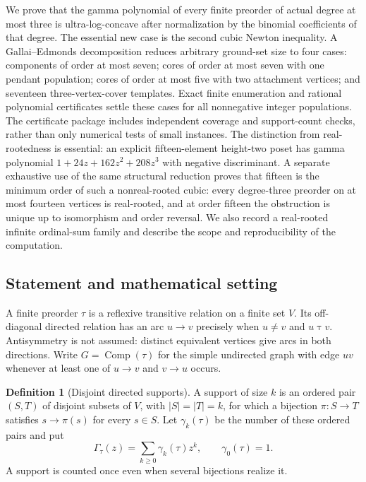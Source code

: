 \documentclass[11pt]{article}
\numberwithin{equation}{section}
\theoremstyle{definition}\newtheorem{definition}[theorem]{Definition}\newtheorem{remark}[theorem]{Remark}
\newcommand{\Ga}{\Gamma}                   %
\newcommand{\Comp}{\operatorname{Comp}}    %
\begin{document}
We prove that the gamma polynomial of every finite preorder of actual degree at most three is ultra-log-concave after normalization by the binomial coefficients of that degree. The essential new case is the second cubic Newton inequality. A Gallai--Edmonds decomposition reduces arbitrary ground-set size to four cases: components of order at most seven; cores of order at most seven with one pendant population; cores of order at most five with two attachment vertices; and seventeen three-vertex-cover templates. Exact finite enumeration and rational polynomial certificates settle these cases for all nonnegative integer populations. The certificate package includes independent coverage and support-count checks, rather than only numerical tests of small instances. The distinction from real-rootedness is essential: an explicit fifteen-element height-two poset has gamma polynomial $1+24z+162z^2+208z^3$ with negative discriminant. A separate exhaustive use of the same structural reduction proves that fifteen is the minimum order of such a nonreal-rooted cubic: every degree-three preorder on at most fourteen vertices is real-rooted, and at order fifteen the obstruction is unique up to isomorphism and order reversal. We also record a real-rooted infinite ordinal-sum family and describe the scope and reproducibility of the computation.

\subsection{Statement and mathematical setting}

A finite preorder $\tau$ is a reflexive transitive relation on a finite set $V$. Its off-diagonal directed relation has an arc $u\to v$ precisely when $u\ne v$ and $u\mathrel\tau v$. Antisymmetry is not assumed: distinct equivalent vertices give arcs in both directions. Write $G=\Comp(\tau)$ for the simple undirected graph with edge $uv$ whenever at least one of $u\to v$ and $v\to u$ occurs.

\begin{definition}[Disjoint directed supports]
A support of size $k$ is an ordered pair $(S,T)$ of disjoint subsets of $V$, with $|S|=|T|=k$, for which a bijection $\pi:S\longrightarrow T$ satisfies $s\to\pi(s)$ for every $s\in S$. Let $\gamma_k(\tau)$ be the number of these ordered pairs and put
\[
 \Ga_\tau(z)=\sum_{k\ge0}\gamma_k(\tau)z^k,\qquad \gamma_0(\tau)=1.
\]
A support is counted once even when several bijections realize it.
\end{definition}
\end{document}
